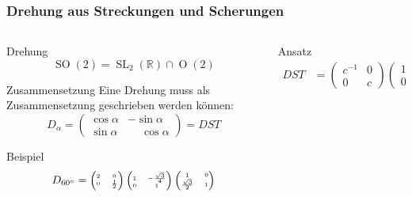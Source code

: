 %
%
%
\bgroup
{}
\begin{frame}[t]
\setlength{\abovedisplayskip}{5pt}
\setlength{\belowdisplayskip}{5pt}
\frametitle{Drehung aus Streckungen und Scherungen}
\vspace{-20pt}
\begin{columns}[t,onlytextwidth]
\begin{column}{0.38\textwidth}
\begin{block}{Drehung}
\[
\operatorname{SO}(2)
=
\operatorname{SL}_2(\mathbb{R}) \cap \operatorname{O}(2)
\]
\end{block}
\begin{block}{Zusammensetzung}
Eine Drehung muss als Zusammensetzung geschrieben werden können:
\[
D_{\alpha} 
=
\begin{pmatrix}
\cos\alpha & -\sin\alpha\\
\sin\alpha &\phantom{-}\cos\alpha
\end{pmatrix}
=
DST
\]
\end{block}
\begin{block}{Beispiel}
\vspace{-12pt}
\[
D_{60^\circ}
=
{\tiny
\begin{pmatrix}2&0\\0&\frac12\end{pmatrix}
\begin{pmatrix}1&-\frac{\sqrt{3}}4\\0&1\end{pmatrix}
\begin{pmatrix}1&0\\\frac{\sqrt{3}}2&1\end{pmatrix}
}
\]
\end{block}
\end{column}
\begin{column}{0.58\textwidth}
\begin{block}{Ansatz}
\vspace{-12pt}
\begin{align*}
DST
&=
\begin{pmatrix}
c^{-1}&0\\
  0   &c
\end{pmatrix}
\begin{pmatrix}
1&-s\\
0&1
\end{pmatrix}
\begin{pmatrix}
1&0\\

\end{pmatrix}
\end{align*}
\end{block}
\end{column}
\end{columns}
\end{frame}
